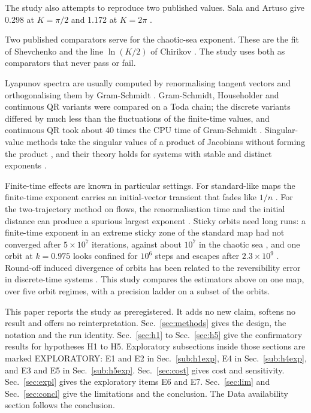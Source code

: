 \documentclass[aip,cha,reprint,amsmath,amssymb,longbibliography]{revtex4-2}
\newcommand{\tenp}[1]{\ensuremath{10^{#1}}}
\newcommand{\Sec}[1]{Sec.~\ref{#1}}
\begin{document}
The study also attempts to reproduce two published values.
Sala and Artuso give 0.298 at $K=\pi/2$ and 1.172 at $K=2\pi$ \cite{SalaArtuso2015}.

Two published comparators serve for the chaotic-sea exponent.
These are the fit of Shevchenko \cite{Shevchenko2014} and the line $\ln(K/2)$ of Chirikov \cite{Chirikov1979}.
The study uses both as comparators that never pass or fail.

Lyapunov spectra are usually computed by renormalising tangent vectors and orthogonalising them by Gram-Schmidt \cite{Benettin1980a,Benettin1980b,ShimadaNagashima1979}.
Gram-Schmidt, Householder and continuous QR variants were compared on a Toda chain; the discrete variants differed by much less than the fluctuations of the finite-time values, and continuous QR took about 40 times the CPU time of Gram-Schmidt \cite{Geist1990}.
Singular-value methods take the singular values of a product of Jacobians without forming the product \cite{Stewart1997}, and their theory holds for systems with stable and distinct exponents \cite{DieciElia2006}.

Finite-time effects are known in particular settings.
For standard-like maps the finite-time exponent carries an initial-vector transient that fades like $1/n$ \cite{SalaArtuso2015}.
For the two-trajectory method on flows, the renormalisation time and the initial distance can produce a spurious largest exponent \cite{DubeibeBermudezAlmanza2014}.
Sticky orbits need long runs: a finite-time exponent in an extreme sticky zone of the standard map had not converged after $5\times10^{7}$ iterations, against about \tenp{7} in the chaotic sea \cite{HarsoulaKaramanosContopoulos2019}, and one orbit at $k=0.975$ looks confined for \tenp{6} steps and escapes after $2.3\times10^{9}$ \cite{Meiss2015}.
Round-off induced divergence of orbits has been related to the reversibility error in discrete-time systems \cite{FarandaMestreTurchetti2012}.
This study compares the estimators above on one map, over five orbit regimes, with a precision ladder on a subset of the orbits.

This paper reports the study as preregistered.
It adds no new claim, softens no result and offers no reinterpretation.
\Sec{sec:methods} gives the design, the notation and the run identity.
\Sec{sec:h1} to \Sec{sec:h5} give the confirmatory results for hypotheses H1 to H5.
Exploratory subsections inside those sections are marked EXPLORATORY: E1 and E2 in \Sec{sub:h1exp}, E4 in \Sec{sub:h4exp}, and E3 and E5 in \Sec{sub:h5exp}.
\Sec{sec:cost} gives cost and sensitivity.
\Sec{sec:expl} gives the exploratory items E6 and E7.
\Sec{sec:lim} and \Sec{sec:concl} give the limitations and the conclusion.
The Data availability section follows the conclusion.
\end{document}
